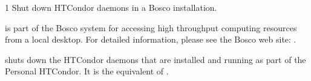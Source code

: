 \begin{ManPage}{\label{man-bosco-stop}}{1}
{Shut down HTCondor daemons in a Bosco installation.}


\Synopsis {}

\Description

 is part of the Bosco system for accessing high
throughput computing resources from a local desktop.
For detailed information, please see the Bosco web site:
.

 shuts down the HTCondor daemons that are installed
and running as part of the Personal HTCondor.
It is the equivalent of .


\end{ManPage}
